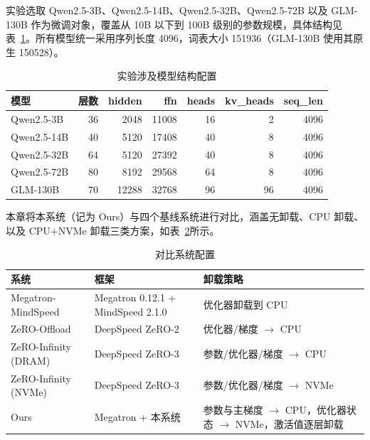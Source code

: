 \documentclass[bachelor,openany,oneside,color,AutoFakeBold=true]{buaathesis}
\begin{document}
实验选取 Qwen2.5-3B、Qwen2.5-14B、Qwen2.5-32B、Qwen2.5-72B 以及 GLM-130B 作为微调对象，覆盖从 10B 以下到 100B 级别的参数规模，具体结构见表~\ref{tab:model}。所有模型统一采用序列长度 4096，词表大小 151936（GLM-130B 使用其原生 150528）。

\begin{table}[!htbp]
  \centering
  \caption{实验涉及模型结构配置}
  \label{tab:model}
  \setlength{\tabcolsep}{4pt}
  \begin{tabular}{lrrrrrr}
    \toprule
    模型 & 层数 & hidden & ffn & heads & kv\_heads & seq\_len \\
    \midrule
    Qwen2.5-3B   & 36 & 2048  & 11008 & 16 & 2  & 4096 \\
    Qwen2.5-14B  & 40 & 5120  & 17408 & 40 & 8  & 4096 \\
    Qwen2.5-32B  & 64 & 5120  & 27392 & 40 & 8  & 4096 \\
    Qwen2.5-72B  & 80 & 8192  & 29568 & 64 & 8  & 4096 \\
    GLM-130B   & 70 & 12288 & 32768 & 96 & 96 & 4096 \\
    \bottomrule
  \end{tabular}
\end{table}

本章将本系统（记为 Ours）与四个基线系统进行对比，涵盖无卸载、CPU 卸载、以及 CPU+NVMe 卸载三类方案，如表~\ref{tab:baseline}所示。

\begin{table}[!htbp]
  \centering
  \caption{对比系统配置}
  \label{tab:baseline}
  \begin{tabular}{lll}
    \toprule
    系统 & 框架 & 卸载策略 \\
    \midrule
    Megatron-MindSpeed   & Megatron 0.12.1 + MindSpeed 2.1.0 & 优化器卸载到 CPU \\
    ZeRO-Offload         & DeepSpeed ZeRO-2 & 优化器/梯度 $\rightarrow$ CPU \\
    ZeRO-Infinity (DRAM) & DeepSpeed ZeRO-3 & 参数/优化器/梯度 $\rightarrow$ CPU \\
    ZeRO-Infinity (NVMe) & DeepSpeed ZeRO-3 & 参数/优化器/梯度 $\rightarrow$ NVMe \\
    Ours               & Megatron + 本系统 & 参数与主梯度 $\rightarrow$ CPU，优化器状态 $\rightarrow$ NVMe，激活值逐层卸载 \\
    \bottomrule
  \end{tabular}
\end{table}
\end{document}
